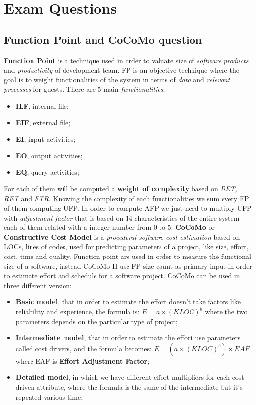 \documentclass{article}
\begin{document}
\section{Exam Questions}
\subsection{Function Point and CoCoMo question}
\textbf{Function Point} is a technique used in order to valuate size of \emph{software products} and \emph{productivity} of development team. FP is an objective technique where the goal is to weight functionalities of the system in terms of \emph{data} and \emph{relevant processes} for guests. There are 5 main \emph{functionalities}: 
\begin{itemize}
\item \textbf{ILF}, internal file;
\item \textbf{EIF}, external file;
\item \textbf{EI}, input activities;
\item \textbf{EO}, output activities;
\item \textbf{EQ}, query activities;
\end{itemize}
For each of them will be computed a \textbf{weight of complexity} based on \emph{DET, RET} and \emph{FTR}. Knowing the complexity of each functionalities we sum every FP of them computing UFP. In order to compute AFP we just need to multiply UFP with \emph{adjustment factor} that is based on 14 characteristics of the entire system each of them related with a integer number from 0 to 5. \textbf{CoCoMo} or \textbf{Constructive Cost Model} is a \emph{procedural software cost estimation} based on LOCs, lines of codes, used for predicting parameters of a project, like size, effort, cost, time and quality. Function point are used in order to measure the functional size of a software, instead CoCoMo II use FP size count as primary input in order to estimate effort and schedule for a software project. CoCoMo can be used in three different version: 
\begin{itemize}
\item \textbf{Basic model}, that in order to estimate the effort doesn't take factors like reliability and experience, the formula is:  $E = a \times (KLOC)^b$ where the two parameters depends on the particular type of project;
\item \textbf{Intermediate model}, that in order to estimate the effort use parameters called cost drivers, and the formula becomes: $E = (a \times (KLOC)^b) \times EAF$ where EAF is \textbf{Effort Adjustment Factor};
\item \textbf{Detailed model}, in which we have different effort multipliers for each cost driven attribute, where the formula is the same of the intermediate but it's repeated various time;
\end{itemize}
\end{document}
